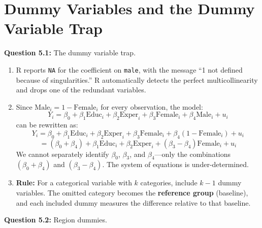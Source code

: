 \documentclass[11pt,letterpaper]{article}
\begin{document}
\newpage

\section{Dummy Variables and the Dummy Variable Trap}

\textbf{Question 5.1:} The dummy variable trap.

\begin{answer}
\begin{enumerate}[label=(\alph*)]
\item R reports \texttt{NA} for the coefficient on \texttt{male}, with the message ``1 not defined because of singularities.'' R automatically detects the perfect multicollinearity and drops one of the redundant variables.

\item Since $\text{Male}_i = 1 - \text{Female}_i$ for every observation, the model:
\[
Y_i = \beta_0 + \beta_1 \text{Educ}_i + \beta_2 \text{Exper}_i + \beta_3 \text{Female}_i + \beta_4 \text{Male}_i + u_i
\]
can be rewritten as:
\[
Y_i = \beta_0 + \beta_1 \text{Educ}_i + \beta_2 \text{Exper}_i + \beta_3 \text{Female}_i + \beta_4(1 - \text{Female}_i) + u_i
\]
\[
= (\beta_0 + \beta_4) + \beta_1 \text{Educ}_i + \beta_2 \text{Exper}_i + (\beta_3 - \beta_4) \text{Female}_i + u_i
\]
We cannot separately identify $\beta_0$, $\beta_3$, and $\beta_4$---only the combinations $(\beta_0 + \beta_4)$ and $(\beta_3 - \beta_4)$. The system of equations is under-determined.

\item \textbf{Rule:} For a categorical variable with $k$ categories, include $k - 1$ dummy variables. The omitted category becomes the \textbf{reference group} (baseline), and each included dummy measures the difference relative to that baseline.
\end{enumerate}
\end{answer}

\textbf{Question 5.2:} Region dummies.
\end{document}
